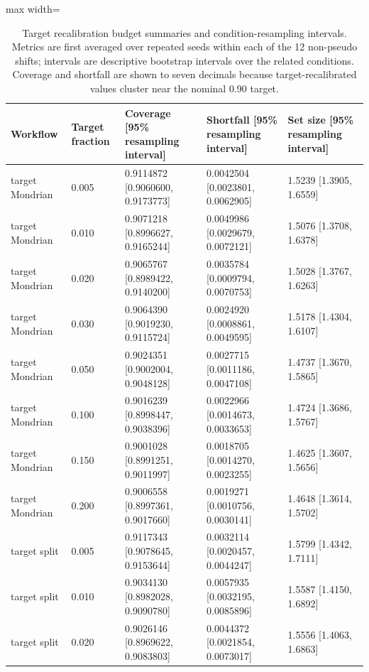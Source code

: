 \begin{table}[!tbp]
\centering
\caption{Target recalibration budget summaries and condition-resampling intervals. Metrics are first averaged over repeated seeds within each of the 12 non-pseudo shifts; intervals are descriptive bootstrap intervals over the related conditions. Coverage and shortfall are shown to seven decimals because target-recalibrated values cluster near the nominal 0.90 target.}
\label{primary-tab:target_budget_shift_uncertainty}
\tiny
\setlength{\tabcolsep}{2pt}
\renewcommand{\arraystretch}{1.08}
\begin{adjustbox}{max width=\textwidth}
\begin{tabular}{@{}lllll@{}}
\toprule
Workflow & Target fraction & Coverage [95\% resampling interval] & Shortfall [95\% resampling interval] & Set size [95\% resampling interval] \\
\midrule
target Mondrian & 0.005 & 0.9114872 [0.9060600, 0.9173773] & 0.0042504 [0.0023801, 0.0062905] & 1.5239 [1.3905, 1.6559] \\
target Mondrian & 0.010 & 0.9071218 [0.8996627, 0.9165244] & 0.0049986 [0.0029679, 0.0072121] & 1.5076 [1.3708, 1.6378] \\
target Mondrian & 0.020 & 0.9065767 [0.8989422, 0.9140200] & 0.0035784 [0.0009794, 0.0070753] & 1.5028 [1.3767, 1.6263] \\
target Mondrian & 0.030 & 0.9064390 [0.9019230, 0.9115724] & 0.0024920 [0.0008861, 0.0049595] & 1.5178 [1.4304, 1.6107] \\
target Mondrian & 0.050 & 0.9024351 [0.9002004, 0.9048128] & 0.0027715 [0.0011186, 0.0047108] & 1.4737 [1.3670, 1.5865] \\
target Mondrian & 0.100 & 0.9016239 [0.8998447, 0.9038396] & 0.0022966 [0.0014673, 0.0033653] & 1.4724 [1.3686, 1.5767] \\
target Mondrian & 0.150 & 0.9001028 [0.8991251, 0.9011997] & 0.0018705 [0.0014270, 0.0023255] & 1.4625 [1.3607, 1.5656] \\
target Mondrian & 0.200 & 0.9006558 [0.8997361, 0.9017660] & 0.0019271 [0.0010756, 0.0030141] & 1.4648 [1.3614, 1.5702] \\
target split & 0.005 & 0.9117343 [0.9078645, 0.9153644] & 0.0032114 [0.0020457, 0.0044247] & 1.5799 [1.4342, 1.7111] \\
target split & 0.010 & 0.9034130 [0.8982028, 0.9090780] & 0.0057935 [0.0032195, 0.0085896] & 1.5587 [1.4150, 1.6892] \\
target split & 0.020 & 0.9026146 [0.8969622, 0.9083803] & 0.0044372 [0.0021854, 0.0073017] & 1.5556 [1.4063, 1.6863] \\

\end{tabular}
\end{adjustbox}
\end{table}
